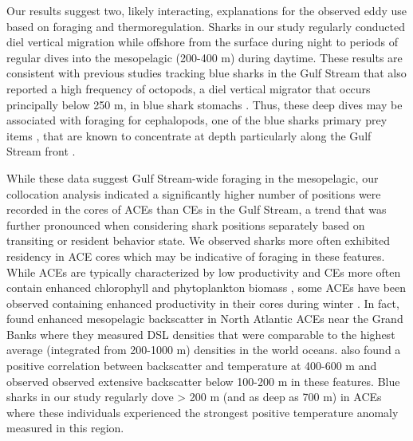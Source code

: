 Our results suggest two, likely interacting, explanations for the observed eddy use based on foraging and thermoregulation. Sharks in our study regularly conducted diel vertical migration while offshore from the surface during night to periods of regular dives into the mesopelagic (200-400 m) during daytime. These results are consistent with previous studies tracking blue sharks in the Gulf Stream that also reported a high frequency of octopods, a diel vertical migrator that occurs principally below 250 m, in blue shark stomachs \citep{Carey1990}. Thus, these deep dives may be associated with foraging for cephalopods, one of the blue sharks primary prey items \citep{Clarke1974, Henderson2001}, that are known to concentrate at depth particularly along the Gulf Stream front \citep{Vovk1978, Fedulov1986, Dawe1985}. 

While these data suggest Gulf Stream-wide foraging in the mesopelagic, our collocation analysis indicated a significantly higher number of positions were recorded in the cores of ACEs than CEs in the Gulf Stream, a trend that was further pronounced when considering shark positions separately based on transiting or resident behavior state. We observed sharks more often exhibited residency in ACE cores which may be indicative of foraging \citep{Breed2009} in these features. While ACEs are typically characterized by low productivity and CEs more often contain enhanced chlorophyll and phytoplankton biomass \citep{Gaube2017DSR}, some ACEs have been observed containing enhanced productivity in their cores during winter \citep{Dufois2016}. In fact, \cite{Fennell2015} found enhanced mesopelagic backscatter in North Atlantic ACEs near the Grand Banks where they measured DSL densities that were comparable to the highest average (integrated from 200-1000 m) densities in the world oceans. \cite{Fennell2015} also found a positive correlation between backscatter and temperature at 400-600 m and observed observed extensive backscatter below 100-200 m in these features. Blue sharks in our study regularly dove > 200 m (and as deep as 700 m) in ACEs where these individuals experienced the strongest positive temperature anomaly measured in this region.

